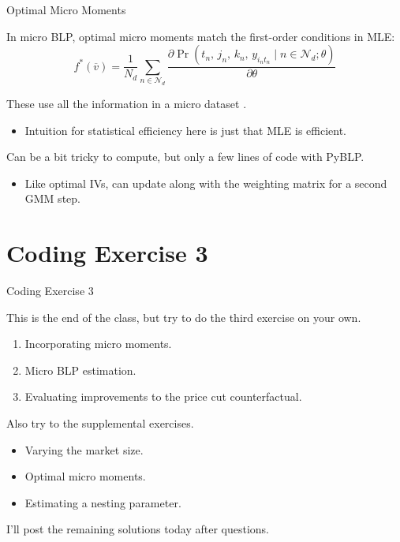 \documentclass[aspectratio=169,t,11pt,table]{beamer}
\begin{document}
\begin{frame}{Optimal Micro Moments}
    \begin{wideitemize}
        \item In micro BLP, \alert{optimal micro moments} match the first-order conditions in MLE:
        \begin{equation*}
            f^*(\overline{v}) = \frac{1}{N_d} \sum_{n \in \mathcal{N}_d} \frac{\partial\Pr(t_n, \, j_n, \, k_n, \, y_{i_nt_n} \mid n \in \mathcal{N}_d; \theta)}{\partial\theta}
        \end{equation*}
        \vspace{-\baselineskip}
        \pause
        \item These use all the information in a micro dataset \citep{conlon2025incorporating}.
        \begin{itemize}
            \item Intuition for statistical efficiency here is just that MLE is efficient.
        \end{itemize}
        \pause
        \item Can be a bit tricky to compute, but only a few lines of code with PyBLP.
        \begin{itemize}
            \item Like optimal IVs, can update along with the weighting matrix for a second GMM step.
        \end{itemize}
    \end{wideitemize}
\end{frame}

\section{Coding Exercise 3}

\begin{frame}{Coding Exercise 3}
    \begin{wideitemize}
        \item This is the end of the class, but try to do the third exercise on your own.
        \begin{enumerate}
            \item Incorporating micro moments.
            \item Micro BLP estimation.
            \item Evaluating improvements to the price cut counterfactual.
        \end{enumerate}
        \pause
        \item Also try to the supplemental exercises.
        \begin{itemize}
            \item Varying the market size.
            \item Optimal micro moments.
            \item Estimating a nesting parameter.
        \end{itemize}
        \pause
        \item I'll post the remaining solutions today after questions.
    \end{wideitemize}
\end{frame}
\end{document}
